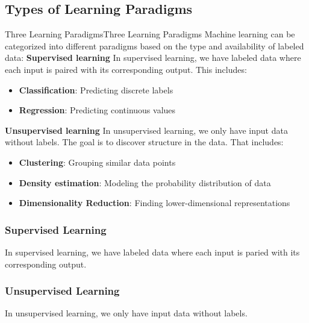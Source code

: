 \documentclass[a4paper]{article}
\theoremstyle{definition}
\begin{document}
\subsection{Types of Learning Paradigms}
\begin{definition}{Three Learning Paradigms}{Three Learning Paradigms}
Machine learning can be categorized into different paradigms based on the type and availability of labeled data:
\vspace{1em}
\noindent
\newline
\textbf{Supervised learning}
\vspace{1em}
\noindent
\newline
In supervised learning, we have labeled data where each input is paired with its corresponding output. This includes:
\begin{itemize}
    \item \textbf{Classification}: Predicting discrete labels 
    \item \textbf{Regression}: Predicting continuous values 
\end{itemize}
\vspace{1em}
\noindent
\newline
\textbf{Unsupervised learning}
\vspace{1em}
\noindent
\newline
In unsupervised learning, we only have input data without labels. The goal is to discover 
structure in the data. That includes:
\begin{itemize}
    \item \textbf{Clustering}: Grouping similar data points 
    \item \textbf{Density estimation}: Modeling the probability distribution of data
    \item \textbf{Dimensionality Reduction}: Finding lower-dimensional representations
\end{itemize}
\end{definition}
\subsubsection{Supervised Learning}
In supervised learning, we have labeled data where each input is paried with its corresponding output.
\subsubsection{Unsupervised Learning}
In unsupervised learning, we only have input data without labels.
\end{document}
